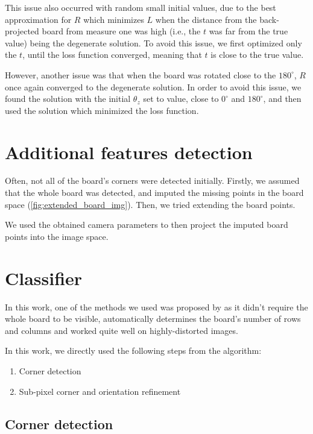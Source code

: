 This issue also occurred with random small initial values, due to the best
approximation for \(R\) which minimizes \(L\) when the distance from the
back-projected board from measure one was high (i.e., the \(t\) was far from
the true value) being the degenerate solution. To avoid this issue, we first optimized only the \(t\),
until the loss function converged, meaning that \(t\) is close to the true
value.

However, another issue was that when the board was rotated close to the
\(180^{\circ}\), \(R\) once again converged to the degenerate solution. In order
to avoid this issue, we found the solution with the initial \(\theta_z\) set to
value, close to \(0^{\circ}\) and \(180^{\circ}\), and then used the solution
which minimized the loss function.

\section{Additional features detection}\label{sec:additional_features_detection}

Often, not all of the board's corners were detected initially. Firstly, we
assumed that the whole board was detected, and imputed the missing points in the
board space (\cref{fig:extended_board_img}). Then, we tried extending the board
points.

We used the obtained camera parameters to then project the imputed board points
into the image space.

\section{Classifier}\label{sec:classifier}

In this work, one of the methods we used was proposed by
\cite{geigerAutomaticCameraRange2012} as it didn't require the whole board to be
visible, automatically determines the board's number of rows and columns and
worked quite well on highly-distorted images.

In this work, we directly used the following steps from the algorithm:
\begin{enumerate}
	\item Corner detection
	\item Sub-pixel corner and orientation refinement
\end{enumerate}

\subsection{Corner detection}\label{sub:corner_detection}

